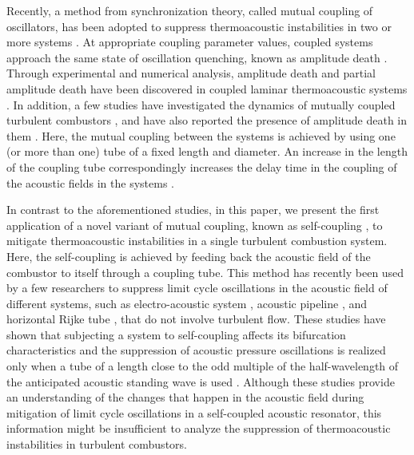 \documentclass[twocolumn,10pt]{article} %
\begin{document}
Recently, a method from synchronization theory, called mutual coupling of oscillators, has been adopted to suppress thermoacoustic instabilities in two or more systems \cite{sujith2021thermoacoustic}. At appropriate coupling parameter values, coupled systems approach the same  state of oscillation quenching, known as amplitude death \cite{zou2021quenching}. Through experimental and numerical analysis, amplitude death and partial amplitude death have been discovered in coupled laminar thermoacoustic systems \cite{thomas2018effect1, dange2019oscillation, hyodo2020suppression, srikanth2021dynamical}. In addition, a few studies have investigated the dynamics of mutually coupled turbulent combustors \cite{thomas2018effect, jegal2019mutual, moon2020mutual, guan2021low}, and have also reported the presence of amplitude death in them \cite{jegal2019mutual}. Here, the mutual coupling between the systems is achieved by using one (or more than one) tube of a fixed length and diameter. An increase in the length of the coupling tube correspondingly increases the delay time in the coupling of the acoustic fields in the systems \cite{dange2019oscillation, sahay2021dynamics}.

In contrast to the aforementioned studies, in this paper, we present the first application of a novel variant of mutual coupling, known as self-coupling \cite{just1997mechanism}, to mitigate thermoacoustic instabilities in a single turbulent combustion system. Here, the self-coupling is achieved by feeding back the acoustic field of the combustor to itself through a coupling tube. This method has recently been used by a few researchers to suppress limit cycle oscillations in the acoustic field of different systems, such as electro-acoustic system \cite{biwa2016suppression}, acoustic pipeline \cite{lato2019passive}, and horizontal Rijke tube \cite{srikanth2021selfcoupling}, that do not involve turbulent flow. These studies have shown that subjecting a system to self-coupling affects its bifurcation characteristics \cite{srikanth2021selfcoupling} and the suppression of acoustic pressure oscillations is realized only when a tube of a length close to the odd multiple of the half-wavelength of the anticipated acoustic standing wave is used \cite{biwa2016suppression, lato2019passive}. Although these studies provide an understanding of the changes that happen in the acoustic field during mitigation of limit cycle oscillations in a self-coupled acoustic resonator, this information might be insufficient to analyze the suppression of thermoacoustic instabilities in turbulent combustors. 
\end{document}

